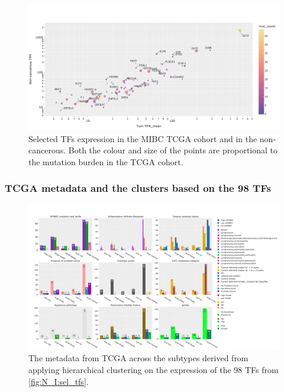 \begin{appendices}
\begin{figure}[H]   
\centering
\includegraphics[width=1.0\textwidth,height=1.0\textheight,keepaspectratio]{Sections/Network_I/Resources/selective_pruning/sel_tfs_mean_tum_healthy.png}
  \caption{Selected TFs expression in the MIBC TCGA cohort and in the non-cancerous. Both the colour and size of the points are proportional to the mutation burden in the TCGA cohort.}
\label{fig:ap:sel_tfs_mean}
\end{figure}

\subsubsection{TCGA metadata and the clusters based on the 98 TFs} 

\label{s:ap:sel_prun_tcga_meta}

\begin{figure}[!htb]   
\centering
\includegraphics[width=1.0\textwidth,height=1.0\textheight,keepaspectratio]{Sections/Network_I/Resources/selective_pruning/sel_tfs_tcga_meta.png}
  \caption{The metadata from TCGA \cite{Robertson2017-mg} across the subtypes derived from applying hierarchical clustering on the expression of the 98 TFs from \cref{fig:N_I:sel_tfs}. }
\label{fig:ap:sel_tfs_tcga_metadata}
\end{figure}


\end{appendices}
